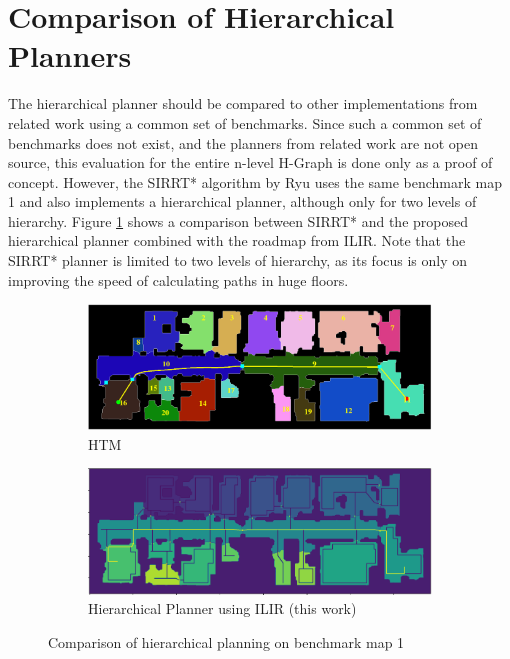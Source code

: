 \section{Comparison of Hierarchical Planners}
\label{sec:evaluation_hierarchical}
The hierarchical planner should be compared to other implementations from related work using a common set of benchmarks. Since such a common set of benchmarks does not exist, and the planners from related work are not open source, this evaluation for the entire n-level H-Graph is done only as a proof of concept. However, the SIRRT* algorithm by Ryu \cite{ryu_hierarchical_2020} uses the same benchmark map 1 and also implements a hierarchical planner, although only for two levels of hierarchy. Figure \ref{fig:ryu_floor_comparison} shows a comparison between SIRRT* and the proposed hierarchical planner combined with the roadmap from ILIR. Note that the SIRRT* planner is limited to two levels of hierarchy, as its focus is only on improving the speed of calculating paths in huge floors. 

\begin{figure}[h]
    \captionsetup[subfigure]{justification=centering}
    \centering
    \begin{subfigure}{0.75\textwidth}
      \centering
      \includegraphics[width=\textwidth]{figures/60_results/ryu_example_path_htm.png}
      \caption{HTM \cite{hou_straight_2021}}
    \end{subfigure}
    \begin{subfigure}{0.75\textwidth}
      \centering
      \includegraphics[width=\textwidth]{figures/60_results/ryu_example_path_ilir.png}
      \caption{Hierarchical Planner using ILIR (this work)}
    \end{subfigure}
    \caption[Comparison of hierarchical planning on benchmark map 1]{Comparison of hierarchical planning on benchmark map 1}
    \label{fig:ryu_floor_comparison}
\end{figure}

